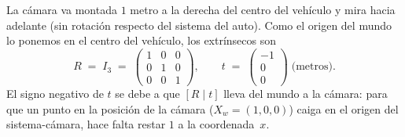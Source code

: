 \documentclass[11pt,a4paper]{article}
\begin{document}
La cámara va montada $1$ metro a la derecha del centro del vehículo y
mira hacia adelante (sin rotación respecto del sistema del auto). Como
el origen del mundo lo ponemos en el centro del vehículo, los
extrínsecos son
\[
  R \;=\; I_{3} \;=\;
  \begin{pmatrix} 1 & 0 & 0 \\ 0 & 1 & 0 \\ 0 & 0 & 1 \end{pmatrix},
  \qquad
  t \;=\;
  \begin{pmatrix} -1 \\ 0 \\ 0 \end{pmatrix}
  \;\text{(metros).}
\]
El signo negativo de $t$ se debe a que $[R\mid t]$ lleva del mundo a la
cámara: para que un punto en la posición de la cámara
($X_w=(1,0,0)$) caiga en el origen del sistema-cámara, hace falta
restar $1$ a la coordenada~$x$.
\end{document}
